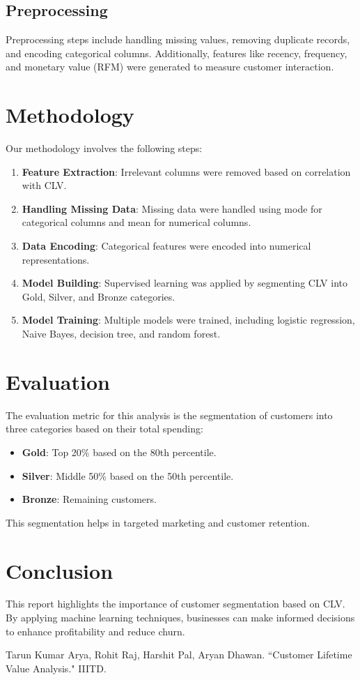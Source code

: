\documentclass{article}
\begin{document}
\subsection{Preprocessing}
Preprocessing steps include handling missing values, removing duplicate records, and encoding categorical columns. Additionally, features like recency, frequency, and monetary value (RFM) were generated to measure customer interaction.

\section{Methodology}
Our methodology involves the following steps:
\begin{enumerate}
    \item \textbf{Feature Extraction}: Irrelevant columns were removed based on correlation with CLV.
    \item \textbf{Handling Missing Data}: Missing data were handled using mode for categorical columns and mean for numerical columns.
    \item \textbf{Data Encoding}: Categorical features were encoded into numerical representations.
    \item \textbf{Model Building}: Supervised learning was applied by segmenting CLV into Gold, Silver, and Bronze categories.
    \item \textbf{Model Training}: Multiple models were trained, including logistic regression, Naive Bayes, decision tree, and random forest.
\end{enumerate}

\section{Evaluation}
The evaluation metric for this analysis is the segmentation of customers into three categories based on their total spending:
\begin{itemize}
    \item \textbf{Gold}: Top 20\% based on the 80th percentile.
    \item \textbf{Silver}: Middle 50\% based on the 50th percentile.
    \item \textbf{Bronze}: Remaining customers.
\end{itemize}
This segmentation helps in targeted marketing and customer retention.

\section{Conclusion}
This report highlights the importance of customer segmentation based on CLV. By applying machine learning techniques, businesses can make informed decisions to enhance profitability and reduce churn.

\begin{thebibliography}{9}
 Tarun Kumar Arya, Rohit Raj, Harshit Pal, Aryan Dhawan. ``Customer Lifetime Value Analysis." IIITD.
\end{thebibliography}
\end{document}
